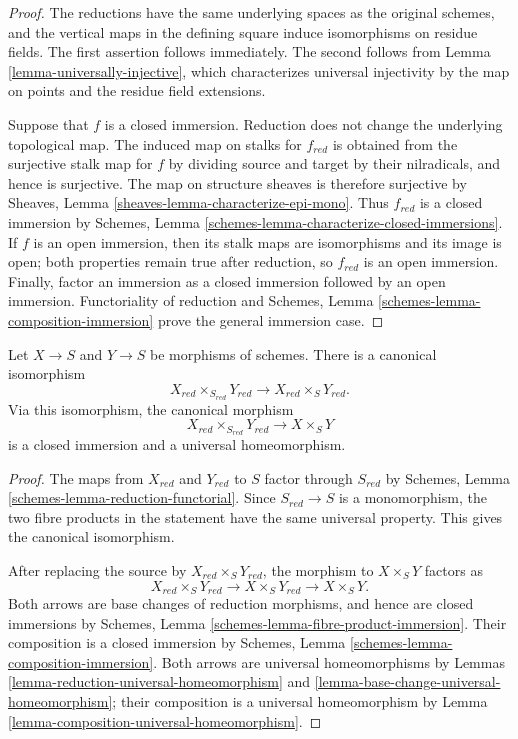 \begin{proof}
The reductions have the same underlying spaces as the original schemes, and
the vertical maps in the defining square induce isomorphisms on residue
fields. The first assertion follows immediately. The second follows from
Lemma \ref{lemma-universally-injective}, which characterizes universal
injectivity by the map on points and the residue field extensions.

Suppose that $f$ is a closed immersion. Reduction does not change the
underlying topological map. The induced map on stalks for $f_{red}$ is
obtained from the surjective stalk map for $f$ by dividing source and target
by their nilradicals, and hence is surjective. The map on structure sheaves
is therefore surjective by Sheaves, Lemma
\ref{sheaves-lemma-characterize-epi-mono}. Thus $f_{red}$ is a closed
immersion by Schemes, Lemma
\ref{schemes-lemma-characterize-closed-immersions}. If $f$ is an open
immersion, then its stalk maps are isomorphisms and its image is open; both
properties remain true after reduction, so $f_{red}$ is an open immersion.
Finally, factor an immersion as a closed immersion followed by an open
immersion. Functoriality of reduction and Schemes, Lemma
\ref{schemes-lemma-composition-immersion} prove the general immersion case.
\end{proof}

\begin{lemma}
\label{lemma-reductions-fibre-product}
\begin{reference}
\cite[Proposition 5.1.7]{EGA1}
\end{reference}
Let $X \to S$ and $Y \to S$ be morphisms of schemes. There is a canonical
isomorphism
$$
X_{red} \times_{S_{red}} Y_{red}
\longrightarrow
X_{red} \times_S Y_{red}.
$$
Via this isomorphism, the canonical morphism
$$
X_{red} \times_{S_{red}} Y_{red} \longrightarrow X \times_S Y
$$
is a closed immersion and a universal homeomorphism.
\end{lemma}

\begin{proof}
The maps from $X_{red}$ and $Y_{red}$ to $S$ factor through $S_{red}$ by
Schemes, Lemma \ref{schemes-lemma-reduction-functorial}. Since
$S_{red} \to S$ is a monomorphism, the two fibre products in the statement
have the same universal property. This gives the canonical isomorphism.

After replacing the source by $X_{red} \times_S Y_{red}$, the morphism to
$X \times_S Y$ factors as
$$
X_{red} \times_S Y_{red} \longrightarrow
X \times_S Y_{red} \longrightarrow X \times_S Y.
$$
Both arrows are base changes of reduction morphisms, and hence are closed
immersions by Schemes, Lemma
\ref{schemes-lemma-fibre-product-immersion}. Their composition is a closed
immersion by Schemes, Lemma \ref{schemes-lemma-composition-immersion}. Both
arrows are universal homeomorphisms by Lemmas
\ref{lemma-reduction-universal-homeomorphism} and
\ref{lemma-base-change-universal-homeomorphism}; their composition is a
universal homeomorphism by
Lemma \ref{lemma-composition-universal-homeomorphism}.
\end{proof}

